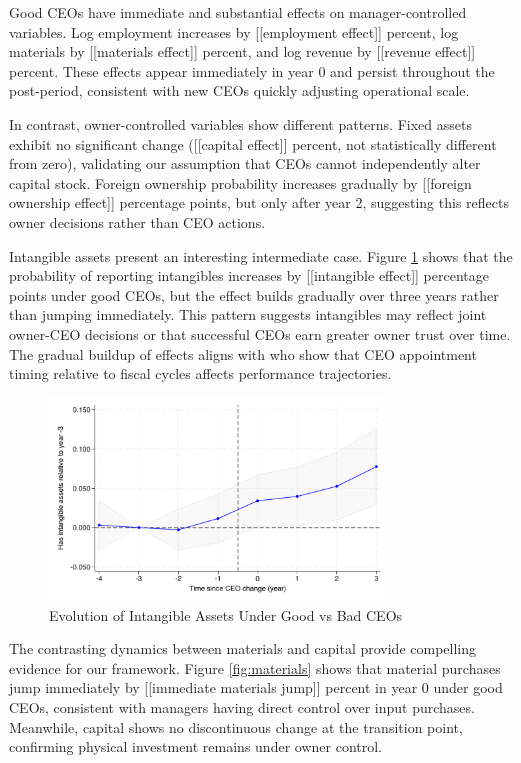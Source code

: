 \documentclass[11pt,a4paper]{article}
\begin{document}
Good CEOs have immediate and substantial effects on manager-controlled variables. Log employment increases by [[employment effect]] percent, log materials by [[materials effect]] percent, and log revenue by [[revenue effect]] percent. These effects appear immediately in year 0 and persist throughout the post-period, consistent with new CEOs quickly adjusting operational scale.



In contrast, owner-controlled variables show different patterns. Fixed assets exhibit no significant change ([[capital effect]] percent, not statistically different from zero), validating our assumption that CEOs cannot independently alter capital stock. Foreign ownership probability increases gradually by [[foreign ownership effect]] percentage points, but only after year 2, suggesting this reflects owner decisions rather than CEO actions.

Intangible assets present an interesting intermediate case. Figure \ref{fig:intangibles} shows that the probability of reporting intangibles increases by [[intangible effect]] percentage points under good CEOs, but the effect builds gradually over three years rather than jumping immediately. This pattern suggests intangibles may reflect joint owner-CEO decisions or that successful CEOs earn greater owner trust over time. The gradual buildup of effects aligns with \citet{li2024ceo} who show that CEO appointment timing relative to fiscal cycles affects performance trajectories.

\begin{figure}[htbp]
\centering
\includegraphics[width=0.8\textwidth]{figure/event_study_has_intangible.pdf}
\caption{Evolution of Intangible Assets Under Good vs Bad CEOs}
\label{fig:intangibles}
\end{figure}

The contrasting dynamics between materials and capital provide compelling evidence for our framework. Figure \ref{fig:materials} shows that material purchases jump immediately by [[immediate materials jump]] percent in year 0 under good CEOs, consistent with managers having direct control over input purchases. Meanwhile, capital shows no discontinuous change at the transition point, confirming physical investment remains under owner control.
\end{document}
